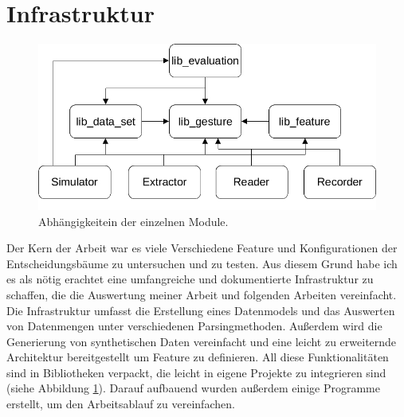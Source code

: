 \section{Infrastruktur}
\begin{figure}
    \centering
    \includegraphics[width=0.75\linewidth]{images/architecture_overview.jpg}
    \caption{Abhängigkeitein der einzelnen Module.}
    \label{fig:architecture_overview}
\end{figure}
Der Kern der Arbeit war es viele Verschiedene Feature und Konfigurationen der Entscheidungsbäume zu untersuchen und zu testen. Aus diesem Grund habe ich es als nötig erachtet eine umfangreiche und dokumentierte Infrastruktur
zu schaffen, die die Auswertung meiner Arbeit und folgenden Arbeiten vereinfacht. Die Infrastruktur umfasst die Erstellung eines Datenmodels und das Auswerten von Datenmengen unter verschiedenen Parsingmethoden.
Außerdem wird die Generierung von synthetischen Daten vereinfacht und eine leicht zu erweiternde Architektur bereitgestellt um Feature zu definieren. All diese Funktionalitäten sind in Bibliotheken verpackt,
die leicht in eigene Projekte zu integrieren sind (siehe Abbildung \ref{fig:architecture_overview}). Darauf aufbauend wurden außerdem einige Programme erstellt, um den Arbeitsablauf zu vereinfachen.







